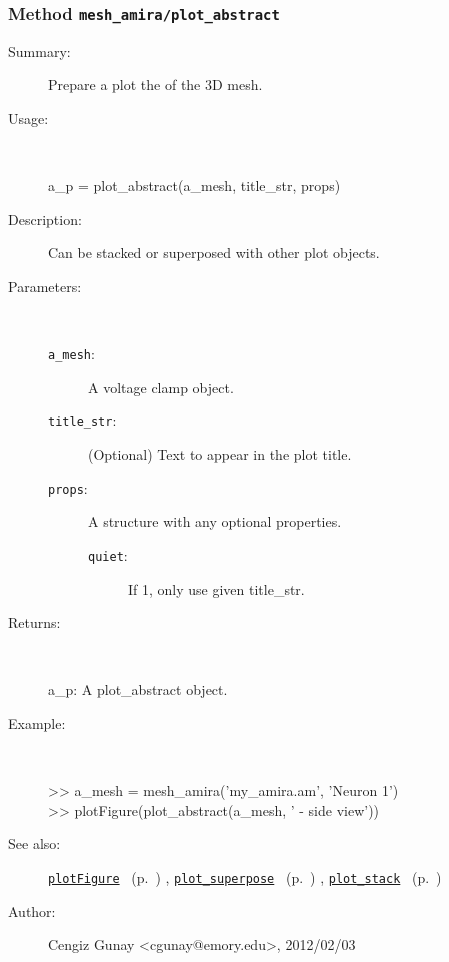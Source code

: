 \subsubsection[Method \texttt{plot\_abstract}]{Method \texttt{mesh\_amira/plot\_abstract}}%
%
\label{ref_mesh_amira__plot_abstract}%
\hypertarget{ref_mesh_amira__plot_abstract}{}%
\begin{description}
\item[Summary:]Prepare a plot the of the 3D mesh.
%
\item[Usage:]~%
\begin{lyxcode}%
a\_p = plot\_abstract(a\_mesh, title\_str, props)
%
\end{lyxcode}%
%
\item[Description:]%
Can be stacked or superposed with other plot objects.
\item[Parameters:]~
\begin{description}%
\item[\texttt{a\_mesh}:]
 A voltage clamp object.
\item[\texttt{title\_str}:]
 (Optional) Text to appear in the plot title.
\item[\texttt{props}:]
 A structure with any optional properties.
\begin{description}%
\item[\texttt{quiet}:]
 If 1, only use given title\_str.
\end{description}%
\end{description}%
%
\item[Returns:
]~

   a\_p: A plot\_abstract object.
%
\item[Example:]~
\begin{lyxcode} >> a\_mesh = mesh\_amira('my\_amira.am', 'Neuron 1')
\\%
 >> plotFigure(plot\_abstract(a\_mesh, ' - side view'))
\\%
\end{lyxcode}
%
\item[See also:]%
\hyperlink{ref_plotFigure}{\texttt{plotFigure}}%
\ (p.~\pageref{ref_plotFigure})%
%
, \hyperlink{ref_plot_superpose}{\texttt{plot\_superpose}}%
\ (p.~\pageref{ref_plot_superpose})%
%
, \hyperlink{ref_plot_stack}{\texttt{plot\_stack}}%
\ (p.~\pageref{ref_plot_stack})%
%
%
\item[Author:]%
Cengiz Gunay <cgunay@emory.edu>, 2012/02/03
%
\end{description}
\methodline%
